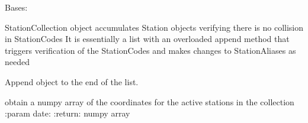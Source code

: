 \documentclass[letterpaper,10pt,english]{sphinxmanual}
\begin{document}

\begin{fulllineitems}
\label{\detokenize{pgamit.classes:pgamit.classes.pyStation.StationCollection}}
\pysigstartsignatures
\pysiglinewithargsret
{}
{}
{}
\pysigstopsignatures
\sphinxAtStartPar
Bases: 

\sphinxAtStartPar
StationCollection object accumulates Station objects verifying there is no collision in StationCodes
It is essentially a list with an overloaded append method that triggers verification of the StationCodes and
makes changes to StationAliases as needed

\begin{fulllineitems}
\label{\detokenize{pgamit.classes:pgamit.classes.pyStation.StationCollection.append}}
\pysigstartsignatures
\pysiglinewithargsret
{}
{}
{}
\pysigstopsignatures
\sphinxAtStartPar
Append object to the end of the list.

\end{fulllineitems}


\begin{fulllineitems}
\label{\detokenize{pgamit.classes:pgamit.classes.pyStation.StationCollection.compare_aliases}}
\pysigstartsignatures
\pysiglinewithargsret
{}
{}
{}
\pysigstopsignatures
\end{fulllineitems}


\begin{fulllineitems}
\label{\detokenize{pgamit.classes:pgamit.classes.pyStation.StationCollection.get_active_coordinates}}
\pysigstartsignatures
\pysiglinewithargsret
{}
{}
{}
\pysigstopsignatures
\sphinxAtStartPar
obtain a numpy array of the coordinates for the active stations in the collection
:param date:
:return: numpy array


\end{fulllineitems}
\end{fulllineitems}
\end{document}
